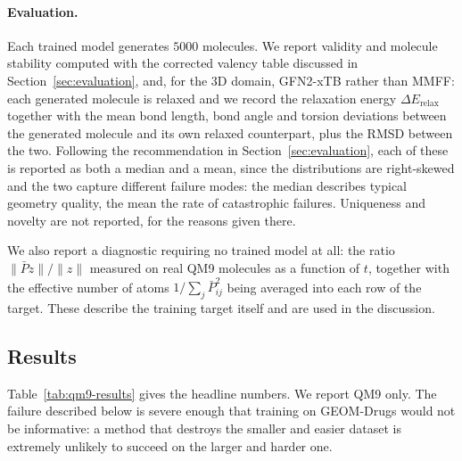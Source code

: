 \paragraph{Evaluation.}
Each trained model generates $5000$ molecules. We report validity and
molecule stability computed with the corrected valency table discussed in
Section~\ref{sec:evaluation}, and, for the 3D domain, GFN2-xTB rather than MMFF: each generated
molecule is relaxed and we record the relaxation energy $\Delta E_{\text{relax}}$ together with the
mean bond length, bond angle and torsion deviations between the generated molecule and its own
relaxed counterpart, plus the RMSD between the two. Following the recommendation in
Section~\ref{sec:evaluation}, each of these is reported as both a median and a mean, since the
distributions are right-skewed and the two capture different failure modes: the median describes
typical geometry quality, the mean the rate of catastrophic failures. Uniqueness and novelty are
not reported, for the reasons given there.

We also report a diagnostic requiring no trained model at all: the ratio
$\|\bar{P}z\| / \|z\|$ measured on real QM9 molecules as a function of $t$, together with the
effective number of atoms $1 / \sum_j \bar{P}_{ij}^2$ being averaged into each row of the target.
These describe the training target itself and are used in the discussion.

\subsection{Results}

Table~\ref{tab:qm9-results} gives the headline numbers. We report QM9 only. The failure described
below is severe enough that training on GEOM-Drugs would not be informative: a method that destroys
the smaller and easier dataset is extremely unlikely to succeed on the larger and harder one.

